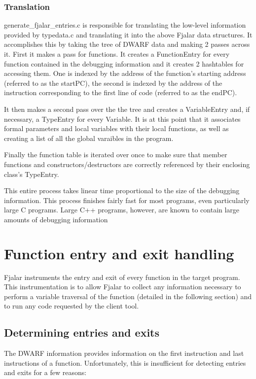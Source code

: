 \documentclass[11pt]{article}
\begin{document}
\subsubsection{Translation}
generate\_fjalar\_entries.c is responsible for translating the low-level
information provided by typedata.c and translating it into the above
Fjalar data structures. It accomplishes this by taking the tree of
DWARF data and making 2 passes across it. First it makes a pass
for functions. It creates a FunctionEntry for every function contained
in the debugging information and it creates 2 hashtables for accessing
them. One is indexed by the address of the function's starting
address (referred to as the startPC), the second is indexed by the
address of the instruction corresponding to the first line of code
(referred to as the endPC). 

It then makes a second pass over the the tree and creates a 
VariableEntry and, if necessary, a TypeEntry for every Variable. It is
at this point that it associates formal parameters and local variables
with their local functions, as well as creating a list of all the
global varaibles in the program.

Finally the function table is iterated over once to make sure that
member functions and constructors/destructors are correctly referenced
by their enclosing class's TypeEntry.

This entire process takes linear time proportional to the size of the
debugging information. This process finishes fairly fast for most
programs, even particularly large C programs. Large C++ programs,
however, are known to contain large amounts of debugging information





\section{Function entry and exit handling}
Fjalar instruments the entry and exit of every function in the target
program. This instrumentation is to allow Fjalar to collect any
information necessary to perform a variable traversal of the function
(detailed in the following section) and to run any code requested by
the client tool.

\subsection{Determining entries and exits}
The DWARF information provides information on the first
instruction and last instructions of a function. Unfortunately, this
is insufficient for detecting entries and exits for a few reasons:
\end{document}
